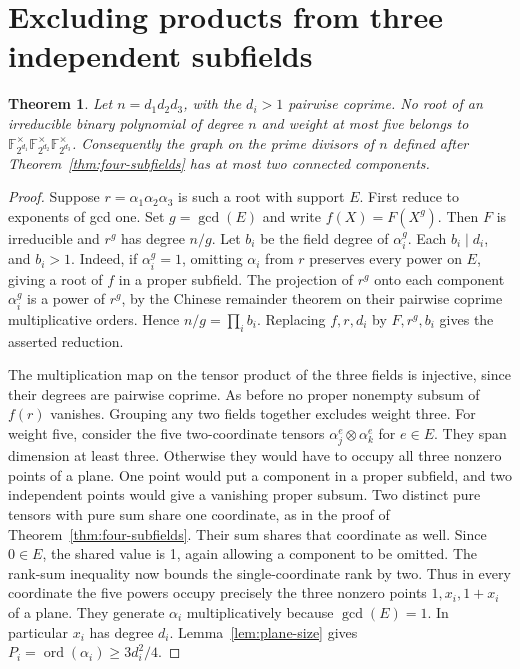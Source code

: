 \documentclass[11pt]{article}
\newtheorem{theorem}{Theorem}
\newcommand{\ord}{\operatorname{ord}}
\begin{document}
\section{Excluding products from three independent subfields}
\begin{theorem}\label{thm:three-subfields}
Let \(n=d_1d_2d_3\), with the \(d_i>1\) pairwise coprime.
No root of an irreducible binary polynomial of degree \(n\) and
weight at most five belongs to
\(\mathbb F_{2^{d_1}}^\times\mathbb F_{2^{d_2}}^\times
\mathbb F_{2^{d_3}}^\times\).
Consequently the graph on the prime divisors of \(n\) defined after
Theorem~\ref{thm:four-subfields} has at most two connected components.
\end{theorem}
\begin{proof}
Suppose \(r=\alpha_1\alpha_2\alpha_3\) is such a root with support
\(E\). First reduce to exponents of gcd one. Set \(g=\gcd(E)\) and
write \(f(X)=F(X^g)\). Then \(F\) is irreducible and \(r^g\) has
degree \(n/g\). Let \(b_i\) be the field degree of \(\alpha_i^g\).
Each \(b_i\mid d_i\), and \(b_i>1\). Indeed, if \(\alpha_i^g=1\), omitting
\(\alpha_i\) from \(r\) preserves every power on \(E\), giving a
root of \(f\) in a proper subfield. The projection of \(r^g\) onto
each component \(\alpha_i^g\) is a power of \(r^g\), by the Chinese
remainder theorem on their pairwise coprime multiplicative orders.
Hence \(n/g=\prod_i b_i\). Replacing \(f,r,d_i\) by
\(F,r^g,b_i\) gives the asserted reduction.

The multiplication map on the tensor product of the three fields is
injective, since their degrees are pairwise coprime. As before no
proper nonempty subsum of \(f(r)\) vanishes. Grouping any two fields
together excludes weight three. For weight five, consider the five
two-coordinate tensors \(\alpha_j^e\otimes\alpha_k^e\) for \(e\in E\).
They span dimension at least three. Otherwise they would have to
occupy all three nonzero points of a plane. One point would put a
component in a proper subfield, and two independent points would
give a vanishing proper subsum. Two distinct pure tensors with pure
sum share one coordinate, as in the proof of
Theorem~\ref{thm:four-subfields}. Their sum shares that coordinate
as well. Since \(0\in E\), the shared value is 1, again allowing a
component to be omitted. The rank-sum inequality now bounds the
single-coordinate rank by two. Thus in every coordinate the five
powers occupy precisely the three nonzero points \(1,x_i,1+x_i\)
of a plane. They generate \(\alpha_i\) multiplicatively because
\(\gcd(E)=1\). In particular \(x_i\) has degree \(d_i\).
Lemma~\ref{lem:plane-size} gives \(P_i=\ord(\alpha_i)\ge3d_i^2/4\).


\end{proof}
\end{document}
